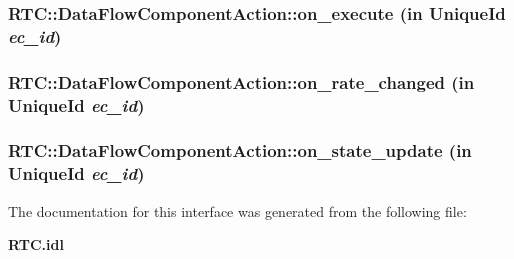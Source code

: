 \subsubsection{ RTC::Data\-Flow\-Component\-Action::on\_\-execute (in {\bf Unique\-Id} {\em ec\_\-id})}\label{interfaceRTC_1_1DataFlowComponentAction_RTC_1_1DataFlowParticipanta0}


\subsubsection{ RTC::Data\-Flow\-Component\-Action::on\_\-rate\_\-changed (in {\bf Unique\-Id} {\em ec\_\-id})}\label{interfaceRTC_1_1DataFlowComponentAction_RTC_1_1DataFlowParticipanta2}


\subsubsection{ RTC::Data\-Flow\-Component\-Action::on\_\-state\_\-update (in {\bf Unique\-Id} {\em ec\_\-id})}\label{interfaceRTC_1_1DataFlowComponentAction_RTC_1_1DataFlowParticipanta1}




The documentation for this interface was generated from the following file:\begin{CompactItemize}
\item 
{\bf RTC.idl}\end{CompactItemize}
